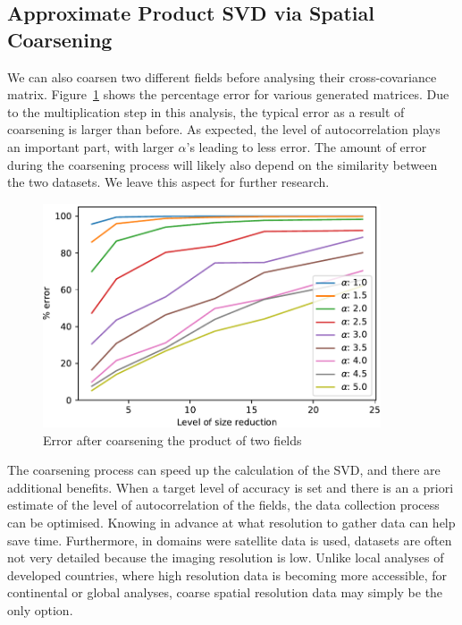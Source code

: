 \documentclass[ijgi,article,submit,moreauthors,pdftex,10pt,a4paper]{Definitions/mdpi}
\begin{document}
\subsection{Approximate Product SVD via Spatial Coarsening}
\label{sec:Materials and Methods/Approximate SVD via Spatial Coarsening}

We can also coarsen two different fields before analysing their cross-covariance matrix. Figure~\ref{fig:plotProductSpatialTemporalFieldsViaCoarsening} shows the percentage error for various generated matrices. Due to the multiplication step in this analysis, the typical error as a result of coarsening is larger than before. As expected, the level of autocorrelation plays an important part, with larger $\alpha$'s leading to less error. The amount of error during the coarsening process will likely also depend on the similarity between the two datasets. We leave this aspect for further research.

\begin{figure}[H]
\centering
\includegraphics[width=100mm]{Results/plotProductSpatialTemporalFieldsViaCoarsening.pdf}
\caption[Error after coarsening product of fields]{Error after coarsening the product of two fields}
\label{fig:plotProductSpatialTemporalFieldsViaCoarsening}
\end{figure}

The coarsening process can speed up the calculation of the SVD, and there are additional benefits. When a target level of accuracy is set and there is an a priori estimate of the level of autocorrelation of the fields, the data collection process can be optimised. Knowing in advance at what resolution to gather data can help save time. Furthermore, in domains were satellite data is used, datasets are often not very detailed because the imaging resolution is low. Unlike local analyses of developed countries, where high resolution data is becoming more accessible, for continental or global analyses, coarse spatial resolution data may simply be the only option.
\end{document}
